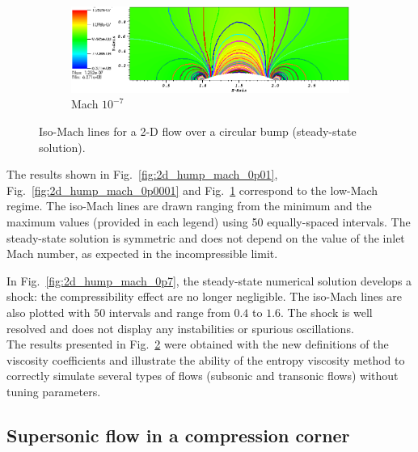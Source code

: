 \documentclass[preprint,10pt]{elsarticle}
\newcommand{\fig}[1]{Fig.~\ref{#1}}                      %
\begin{document}
\begin{figure}[H]
        \begin{subfigure}[b]{0.495\textwidth}
                \centering
                \includegraphics[width=\textwidth]{Hump2D_mach_1em7.png}
                \caption{Mach $10^{-7}$}
                \label{fig:2d_hump_mach_0p0000001}
        \end{subfigure}
        \caption{Iso-Mach lines for a 2-D flow over a circular bump (steady-state solution).}
				\label{fig:2d_hump}
\end{figure}
%
The results shown in \fig{fig:2d_hump_mach_0p01}, \fig{fig:2d_hump_mach_0p0001} and \fig{fig:2d_hump_mach_0p0000001} correspond to the low-Mach regime. The iso-Mach lines are drawn ranging from the minimum and the maximum values (provided in each legend) using 50 equally-spaced intervals. The steady-state solution is symmetric and does not depend on the value of the inlet Mach number, as expected in the incompressible limit. 

In \fig{fig:2d_hump_mach_0p7}, the steady-state numerical solution develops a shock: the compressibility effect are no longer negligible. The iso-Mach lines are also plotted with $50$ intervals and range from $0.4$ to $1.6$. The shock is well resolved and does not display any instabilities or spurious oscillations. \\
The results presented in \fig{fig:2d_hump} were obtained with the new definitions of the viscosity coefficients and illustrate the ability of the entropy viscosity method to correctly simulate several types of flows (subsonic and transonic flows) without tuning parameters.

\subsection{Supersonic flow in a compression corner} \label{sec:corner}
\end{document}
